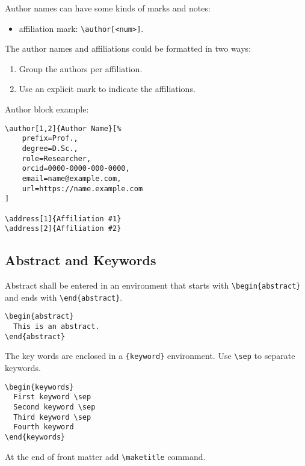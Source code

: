 \documentclass[
]{ceurart}
\begin{document}
Author names can have some kinds of marks and notes:
\begin{itemize}
\item affiliation mark: \verb|\author[<num>]|.
\end{itemize}

The author names and affiliations could be formatted in two ways:
\begin{enumerate}
\item Group the authors per affiliation.
\item Use an explicit mark to indicate the affiliations.
\end{enumerate}

Author block example:
\begin{verbatim}
\author[1,2]{Author Name}[%
    prefix=Prof.,
    degree=D.Sc.,
    role=Researcher,
    orcid=0000-0000-000-0000,
    email=name@example.com,
    url=https://name.example.com
]

\address[1]{Affiliation #1}
\address[2]{Affiliation #2}
\end{verbatim}

\subsection{Abstract and Keywords}

Abstract shall be entered in an environment that starts
with \verb|\begin{abstract}| and ends with
\verb|\end{abstract}|. 

\begin{verbatim}
\begin{abstract}
  This is an abstract.
\end{abstract}
\end{verbatim}

The key words are enclosed in a \verb|{keyword}|
environment. Use \verb|\sep| to separate keywords.

\begin{verbatim}
\begin{keywords}
  First keyword \sep 
  Second keyword \sep 
  Third keyword \sep 
  Fourth keyword
\end{keywords}
\end{verbatim}

At the end of front matter add \verb|\maketitle| command.
\end{document}
